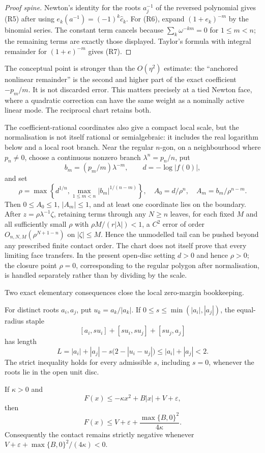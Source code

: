 \documentclass[11pt]{article}
\begin{document}
\begin{proof}[Proof spine]
Newton's identity for the roots $a_j^{-1}$ of the reversed polynomial gives
(R5) after using
$e_k(a^{-1})=(-1)^k\widehat c_k$.  For (R6), expand
$(1+e_k)^{-m}$ by the binomial series.  The constant term cancels because
$\sum_k\omega^{-km}=0$ for $1\le m<n$; the remaining terms are exactly those
displayed.  Taylor's formula with integral remainder for
$(1+e)^{-m}$ gives (R7).
\end{proof}

The conceptual point is stronger than the $O(\eta^2)$ estimate: the
``anchored nonlinear remainder'' is the second and higher part of the exact
coefficient $-p_m/m$.  It is not discarded error.  This matters precisely at
a tied Newton face, where a quadratic correction can have the same weight as
a nominally active linear mode.  The reciprocal chart retains both.

The coefficient-rational coordinates also give a compact local scale, but the
normalisation is not itself rational or semialgebraic: it includes the real
logarithm below and a local root branch.  Near the regular $n$-gon, on a
neighbourhood where $p_n\ne0$, choose a continuous nonzero branch
$\lambda^n=p_n/n$, put
\[
 b_m=(p_m/m)\lambda^{-m},\qquad
 d=-\log|f(0)|,
\]
and set
\[
 \rho=\max\left\{d^{1/n},
   \max_{1\le m<n}|b_m|^{1/(n-m)}\right\},
 \quad A_0=d/\rho^n,
 \quad A_m=b_m/\rho^{n-m}.
\]
Then $0\le A_0\le1$, $|A_m|\le1$, and at least one coordinate lies on the
boundary.  After $z=\rho\lambda^{-1}\zeta$, retaining terms through any
$N\ge n$ leaves, for each fixed $M$ and all sufficiently small $\rho$ with
$\rho M/(r|\lambda|)<1$, a $C^2$ error of order
$O_{n,N,M}(\rho^{N+1-n})$ on $|\zeta|\le M$.  Hence the unmodelled tail can
be pushed beyond any prescribed finite contact order.  The chart does not
itself prove that every limiting face transfers.  In the present open-disc
setting $d>0$ and hence $\rho>0$; the closure point $\rho=0$, corresponding
to the regular polygon after normalisation, is handled separately rather than
by dividing by the scale.

Two exact elementary consequences close the local zero-margin bookkeeping.

\begin{proposition}
\label{res:staple-contact}
For distinct roots $a_i,a_j$, put $u_k=a_k/|a_k|$.  If
$0\le s\le\min(|a_i|,|a_j|)$, the equal-radius staple
\[
 [a_i,su_i]+[su_i,su_j]+[su_j,a_j]
\]
has length
\[
 L=|a_i|+|a_j|-s\bigl(2-|u_i-u_j|\bigr)
 \le |a_i|+|a_j|<2.                                    \tag{R8}
\]
The strict inequality holds for every admissible $s$, including $s=0$,
whenever the roots lie in the open unit disc.

If $\kappa>0$ and
\[
 F(x)\le-\kappa x^2+B|x|+V+\varepsilon,
\]
then
\[
 F(x)\le V+\varepsilon+
   \frac{\max\{B,0\}^2}{4\kappa}.                    \tag{R9}
\]
Consequently the contact remains strictly negative whenever
$V+\varepsilon+\max\{B,0\}^2/(4\kappa)<0$.
\end{proposition}
\end{document}
